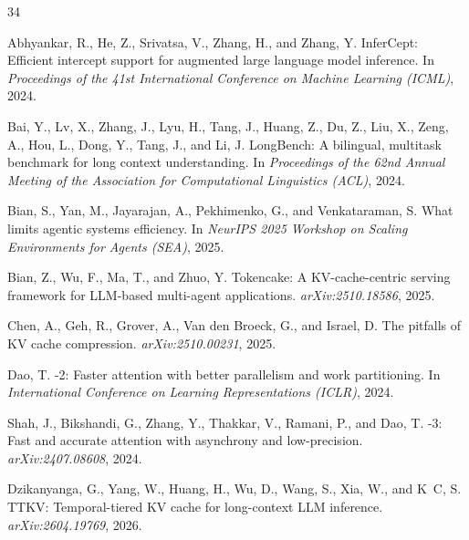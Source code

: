 \documentclass{article}
\begin{document}
\begin{thebibliography}{34}

Abhyankar, R., He, Z., Srivatsa, V., Zhang, H., and Zhang, Y.
\newblock InferCept: Efficient intercept support for augmented large
  language model inference.
\newblock In \emph{Proceedings of the 41st International Conference on
  Machine Learning (ICML)}, 2024.

Bai, Y., Lv, X., Zhang, J., Lyu, H., Tang, J., Huang, Z., Du, Z.,
  Liu, X., Zeng, A., Hou, L., Dong, Y., Tang, J., and Li, J.
\newblock LongBench: A bilingual, multitask benchmark for long context
  understanding.
\newblock In \emph{Proceedings of the 62nd Annual Meeting of the
  Association for Computational Linguistics (ACL)}, 2024.

Bian, S., Yan, M., Jayarajan, A., Pekhimenko, G., and Venkataraman, S.
\newblock What limits agentic systems efficiency.
\newblock In \emph{NeurIPS 2025 Workshop on Scaling Environments for
  Agents (SEA)}, 2025.

Bian, Z., Wu, F., Ma, T., and Zhuo, Y.
\newblock Tokencake: A KV-cache-centric serving framework for
  LLM-based multi-agent applications.
\newblock \emph{arXiv:2510.18586}, 2025.

Chen, A., Geh, R., Grover, A., Van den Broeck, G., and Israel, D.
\newblock The pitfalls of KV cache compression.
\newblock \emph{arXiv:2510.00231}, 2025.

\textcolor{green!50!black}{Dao, T.
-2: Faster attention with better parallelism and work partitioning.
\newblock In \emph{International Conference on Learning Representations (ICLR)}, 2024.}

\textcolor{green!50!black}{Shah, J., Bikshandi, G., Zhang, Y., Thakkar, V., Ramani, P., and Dao, T.
-3: Fast and accurate attention with asynchrony and low-precision.
\newblock \emph{arXiv:2407.08608}, 2024.}

Dzikanyanga, G., Yang, W., Huang, H., Wu, D., Wang, S., Xia, W., and
  K~C, S.
\newblock TTKV: Temporal-tiered KV cache for long-context LLM inference.
\newblock \emph{arXiv:2604.19769}, 2026.


\end{thebibliography}
\end{document}

